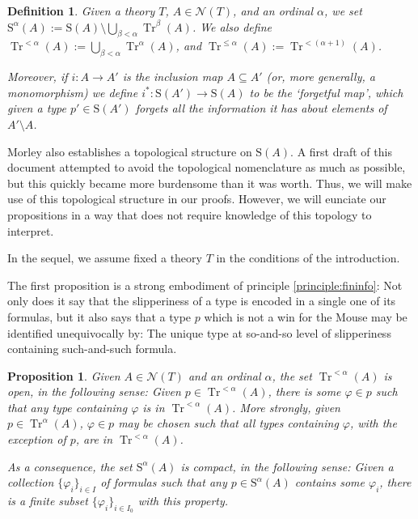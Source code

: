 \documentclass{article}
\newtheorem{prop}[theorem]{Proposition}
\newtheorem{definition}[theorem]{Definition}
\theoremstyle{nonumberplain}
\newcommand{\calN}{\mathcal{N}}
\newcommand{\Stone}{\mathrm{S}}
\DeclareMathOperator{\Tr}{Tr}
\begin{document}
\begin{definition}
Given a theory $T$, $A \in \calN(T)$, and an ordinal $\alpha$, we set $\Stone^\alpha(A) := \Stone(A) \setminus \bigcup_{\beta < \alpha} \Tr^\beta(A)$. We also define $\Tr^{<\alpha}(A) := \bigcup_{\beta < \alpha} \Tr^\alpha(A)$, and $\Tr^{\leq\alpha}(A) := \Tr^{<(\alpha+1)}(A)$.

Moreover, if $i \colon A \to A'$ is the inclusion map $A \subseteq A'$ (or, more generally, a monomorphism) we define $i^* \colon \Stone(A') \to \Stone(A)$ to be the `forgetful map', which given a type $p' \in \Stone(A')$ forgets all the information it has about elements of $A' \setminus A$.
\end{definition}

Morley also establishes a topological structure on $\Stone(A)$. A first draft of this document attempted to avoid the topological nomenclature as much as possible, but this quickly became more burdensome than it was worth. Thus, we will make use of this topological structure in our proofs. However, we will eunciate our propositions in a way that does not require knowledge of this topology to interpret.

In the sequel, we assume fixed a theory $T$ in the conditions of the introduction.

The first proposition is a strong embodiment of principle \ref{principle:fininfo}: Not only does it say that the slipperiness of a type is encoded in a single one of its formulas, but it also says that a type $p$ which is not a win for the Mouse may be identified unequivocally by: The unique type at so-and-so level of slipperiness containing such-and-such formula.

\begin{prop}\label{prop:open}
Given $A \in \calN(T)$ and an ordinal $\alpha$, the set $\Tr^{<\alpha}(A)$ is open, in the following sense: Given $p \in \Tr^{<\alpha}(A)$, there is some $\varphi \in p$ such that any type containing $\varphi$ is in $\Tr^{<\alpha}(A)$. More strongly, given $p \in \Tr^\alpha(A)$, $\varphi \in p$ may be chosen such that all types containing $\varphi$, with the exception of $p$, are in $\Tr^{<\alpha}(A)$.

As a consequence, the set $\Stone^\alpha(A)$ is compact, in the following sense: Given a collection $\{\varphi_i\}_{i \in I}$ of formulas such that any $p \in \Stone^\alpha(A)$ contains some $\varphi_i$, there is a finite subset $\{\varphi_i\}_{i \in I_0}$ with this property.
\end{prop}
\end{document}
